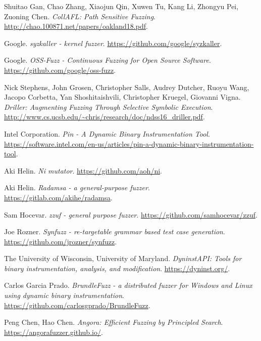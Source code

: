 \begin{thebibliography}{99}
  Shuitao Gan, Chao Zhang, Xiaojun Qin, Xuwen Tu, Kang Li, Zhongyu Pei, Zuoning Chen.
  \textit{CollAFL: Path Sensitive Fuzzing}.
  \url{http://chao.100871.net/papers/oakland18.pdf}.

  Google.
  \textit{syzkaller - kernel fuzzer}.
  \url{https://github.com/google/syzkaller}.

  Google.
  \textit{OSS-Fuzz - Continuous Fuzzing for Open Source Software}.
  \url{https://github.com/google/oss-fuzz}.

  Nick Stephens, John Grosen, Christopher Salls, Audrey Dutcher, Ruoyu Wang,
  Jacopo Corbetta, Yan Shoshitaishvili, Christopher Kruegel, Giovanni Vigna.
  \textit{Driller: Augmenting Fuzzing Through Selective Symbolic Execution}.
  \url{http://www.cs.ucsb.edu/~chris/research/doc/ndss16_driller.pdf}.

  Intel Corporation.
  \textit{Pin - A Dynamic Binary Instrumentation Tool}.
  \url{https://software.intel.com/en-us/articles/pin-a-dynamic-binary-instrumentation-tool}.

  Aki Helin.
  \textit{Ni mutator}.
  \url{https://github.com/aoh/ni}.

  Aki Helin.
  \textit{Radamsa - a general-purpose fuzzer}.
  \url{https://gitlab.com/akihe/radamsa}.

  Sam Hocevar.
  \textit{zzuf - general purpose fuzzer}.
  \url{https://github.com/samhocevar/zzuf}.

  Joe Rozner.
  \textit{Synfuzz - re-targetable grammar based test case generation}.
  \url{https://github.com/jrozner/synfuzz}.

  The University of Wisconsin, University of Maryland.
  \textit{DyninstAPI: Tools for binary instrumentation, analysis, and modification}.
  \url{https://dyninst.org/}.

  Carlos Garcia Prado.
  \textit{BrundleFuzz - a distributed fuzzer for Windows and Linux using dynamic binary instrumentation}.
  \url{https://github.com/carlosgprado/BrundleFuzz}.

  Peng Chen, Hao Chen.
  \textit{Angora: Efficient Fuzzing by Principled Search}.
  \url{https://angorafuzzer.github.io/}.


\end{thebibliography}
